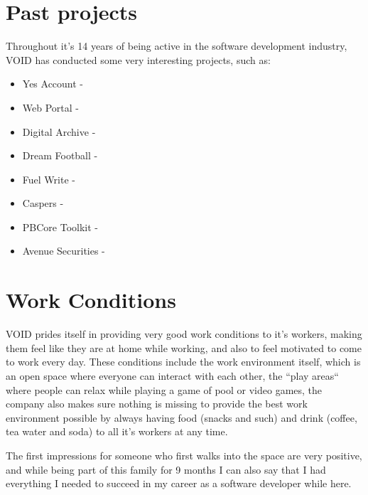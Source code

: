 \section{Past projects}

Throughout it's 14 years of being active in the software development industry, VOID has conducted some very interesting projects, such as:
\begin{itemize}
 \item Yes Account - 
 \item Web Portal - 
 \item Digital Archive - 
 \item Dream Football - 
 \item Fuel Write - 
 \item Caspers - 
 \item PBCore Toolkit - 
 \item Avenue Securities - 
\end{itemize}

\section{Work Conditions}

VOID prides itself in providing very good work conditions to it's workers, making them feel like they are at home while working,
and also to feel motivated to come to work every day. These conditions include the work environment itself, which is an open space where 
everyone can interact with each other, the ``play areas`` where people can relax while playing a game of pool or video games, the company also makes sure nothing is
missing to provide the best work environment possible by always having food (snacks and such) and drink (coffee, tea water and soda) to all it's workers at any time.

The first impressions for someone who first walks into the space are very positive, and while being part of this family for 9 months I can also say that I had everything 
I needed to succeed in my career as a software developer while here.